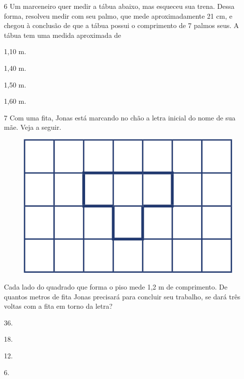 \num{6} Um marceneiro quer medir a tábua abaixo, mas esqueceu sua trena. Dessa
forma, resolveu medir com seu palmo, que mede aproximadamente 21 cm, e
chegou à conclusão de que a tábua possui o comprimento
de 7 palmos seus. A tábua tem uma medida aproximada de

\begin{multicols}{2}
\begin{escolha}
\item
  1,10 m.
\item
  1,40 m.
\item
  1,50 m.
\item
  1,60 m.
\end{escolha}
\end{multicols}

\num{7} Com uma fita, Jonas está marcando no chão a letra inicial do nome de
sua mãe. Veja a seguir.

\begin{figure}[htpb!]
\centering
\includegraphics[width=\textwidth]{media/image81.png}
\end{figure}

Cada lado do quadrado que forma o piso mede 1,2 m de
comprimento. De quantos metros de fita Jonas precisará para concluir seu
trabalho, se dará três voltas com a fita em torno da letra?

\begin{multicols}{2}
\begin{escolha}
\item
  36.
\item
  18.
\item
  12.
\item
  6.
\end{escolha}
\end{multicols}



